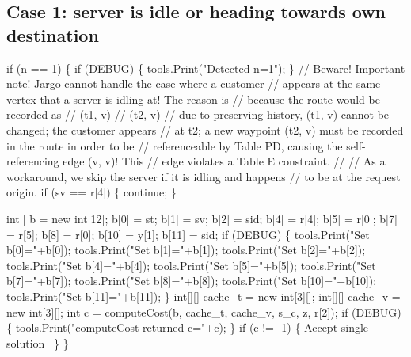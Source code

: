 \subsection{Case 1: server is idle or heading towards own destination}
\nwenddocs{}\endmoddef\nwstartdeflinemarkup{}\nwenddeflinemarkup
if (n == 1) \{
  if (DEBUG) \{
    tools.Print("Detected n=1");
  \}
  // Beware! Important note! Jargo cannot handle the case where a customer
  // appears at the same vertex that a server is idling at! The reason is
  // because the route would be recorded as
  //   (t1, v)
  //   (t2, v)
  // due to preserving history, (t1, v) cannot be changed; the customer appears
  // at t2; a new waypoint (t2, v) must be recorded in the route in order to be
  // referenceable by Table PD, causing the self-referencing edge (v, v)! This
  // edge violates a Table E constraint.
  //
  // As a workaround, we skip the server if it is idling and happens
  // to be at the request origin.
  if (sv == r[4]) \{
    continue;
  \}

  int[] b = new int[12];
  b[0] = st;
  b[1] = sv;
  b[2] = sid;
  b[4] = r[4];
  b[5] = r[0];
  b[7] = r[5];
  b[8] = r[0];
  b[10] = y[1];
  b[11] = sid;
  if (DEBUG) \{
    tools.Print("Set b[0]="+b[0]);
    tools.Print("Set b[1]="+b[1]);
    tools.Print("Set b[2]="+b[2]);
    tools.Print("Set b[4]="+b[4]);
    tools.Print("Set b[5]="+b[5]);
    tools.Print("Set b[7]="+b[7]);
    tools.Print("Set b[8]="+b[8]);
    tools.Print("Set b[10]="+b[10]);
    tools.Print("Set b[11]="+b[11]);
  \}
  int[][] cache_t = new int[3][];
  int[][] cache_v = new int[3][];
  int c = computeCost(b, cache_t, cache_v, s_c, z, r[2]);
  if (DEBUG) \{
    tools.Print("computeCost returned c="+c);
  \}
  if (c != -1) \{
    \LA{}Accept single solution~{\nwtagstyle{}}\RA{}
  \}
\}
\nwendcode{}\nwdocspar

